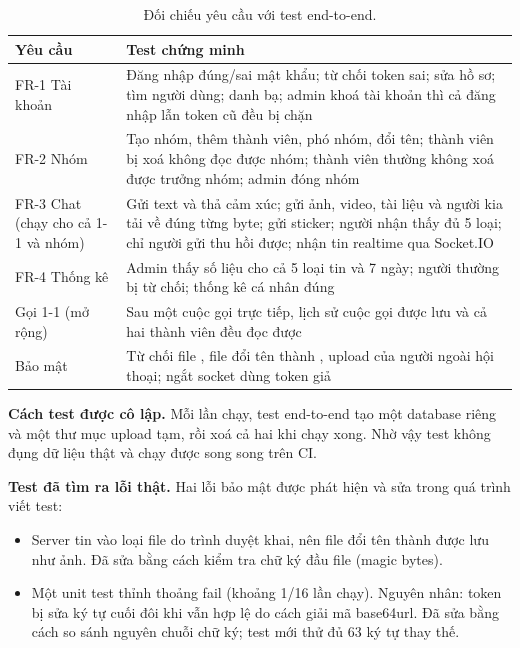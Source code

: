 \documentclass[11pt, a4paper]{article}
\begin{document}
\begin{table}[H]
  \centering
  \small
  \caption{Đối chiếu yêu cầu với test end-to-end.}
  \label{tab:e2e}
  \begin{tabularx}{\linewidth}{P{3cm}Y}
    \toprule
    \textbf{Yêu cầu} & \textbf{Test chứng minh} \\
    \midrule
    FR-1 Tài khoản & Đăng nhập đúng/sai mật khẩu; từ chối token sai; sửa hồ sơ; tìm người dùng; danh bạ; admin khoá tài khoản thì cả đăng nhập lẫn token cũ đều bị chặn \\
    FR-2 Nhóm & Tạo nhóm, thêm thành viên, phó nhóm, đổi tên; thành viên bị xoá không đọc được nhóm; thành viên thường không xoá được trưởng nhóm; admin đóng nhóm \\
    FR-3 Chat (chạy cho cả 1-1 và nhóm) & Gửi text và thả cảm xúc; gửi ảnh, video, tài liệu và người kia tải về đúng từng byte; gửi sticker; người nhận thấy đủ 5 loại; chỉ người gửi thu hồi được; nhận tin realtime qua Socket.IO \\
    FR-4 Thống kê & Admin thấy số liệu cho cả 5 loại tin và 7 ngày; người thường bị từ chối; thống kê cá nhân đúng \\
    Gọi 1-1 (mở rộng) & Sau một cuộc gọi trực tiếp, lịch sử cuộc gọi được lưu và cả hai thành viên đều đọc được \\
    Bảo mật & Từ chối file , file  đổi tên thành , upload của người ngoài hội thoại; ngắt socket dùng token giả \\
    \bottomrule
  \end{tabularx}
\end{table}

\textbf{Cách test được cô lập.} Mỗi lần chạy, test end-to-end tạo một database riêng  và một thư mục upload tạm, rồi xoá cả hai khi chạy xong. Nhờ vậy test không đụng dữ liệu thật và chạy được song song trên CI.

\textbf{Test đã tìm ra lỗi thật.} Hai lỗi bảo mật được phát hiện và sửa trong quá trình viết test:
\begin{itemize}
  \item Server tin vào loại file do trình duyệt khai, nên file  đổi tên thành  được lưu như ảnh. Đã sửa bằng cách kiểm tra chữ ký đầu file (magic bytes).
  \item Một unit test thỉnh thoảng fail (khoảng 1/16 lần chạy). Nguyên nhân: token bị sửa ký tự cuối đôi khi vẫn hợp lệ do cách giải mã base64url. Đã sửa bằng cách so sánh nguyên chuỗi chữ ký; test mới thử đủ 63 ký tự thay thế.
\end{itemize}
\end{document}
